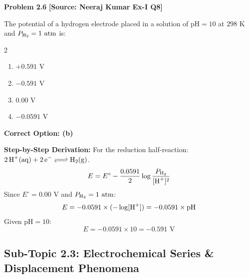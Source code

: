 \begin{problembox}
\textbf{Problem 2.6} \hfill \textbf{[Source: Neeraj Kumar Ex-I Q8]}

The potential of a hydrogen electrode placed in a solution of $\text{pH} = 10$ at $298\text{ K}$ and $P_{\ce{H2}} = 1\text{ atm}$ is:
\begin{multicols}{2}
\begin{enumerate}[label=(\alph*)]
    \item $+0.591\text{ V}$
    \item $-0.591\text{ V}$
    \item $0.00\text{ V}$
    \item $-0.0591\text{ V}$
\end{enumerate}
\end{multicols}
\end{problembox}
\begin{solution}
\textbf{Correct Option: (b)}

\textbf{Step-by-Step Derivation:}
For the reduction half-reaction: $\ce{2H+(aq) + 2e^- <=> H2(g)}$.
\begin{equation*}
    E = E^\circ - \frac{0.0591}{2} \log \frac{P_{\ce{H2}}}{[\ce{H+}]^2}
\end{equation*}
Since $E^\circ = 0.00\text{ V}$ and $P_{\ce{H2}} = 1\text{ atm}$:
\begin{equation*}
    E = -0.0591 \times (-\log [\ce{H+}]) = -0.0591 \times \text{pH}
\end{equation*}
Given $\text{pH} = 10$:
\begin{equation*}
    E = -0.0591 \times 10 = -0.591\text{ V}
\end{equation*}
\end{solution}

\subsection{Sub-Topic 2.3: Electrochemical Series \& Displacement Phenomena}

